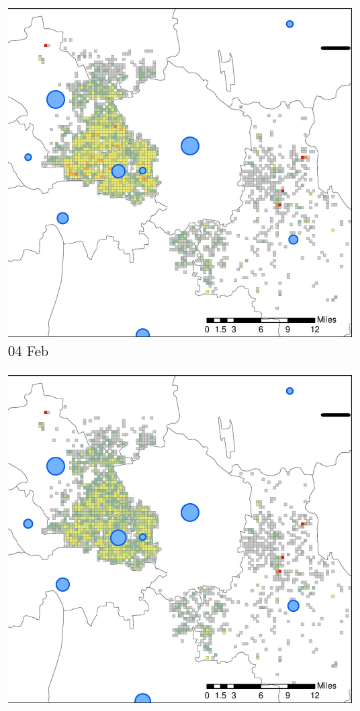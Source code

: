 \documentclass[preprints,ijgi,submit,moreauthors]{Definitions/mdpi}
\begin{document}
\begin{figure}[H]
    \vspace{6pt}    
    \begin{subfigure}{.3\textwidth}
        \includegraphics[width=\textwidth]{Figures/Relation_with_confrimed_cases/NewDistrictSSBD2020_02_04.eps}
        \caption{04 Feb}
    \end{subfigure}
    \begin{subfigure}{.3\textwidth}
        \includegraphics[width=\textwidth]{Figures/Relation_with_confrimed_cases/NewDistrictSSBD2020_02_08.eps}

\end{subfigure}
\end{figure}
\end{document}
